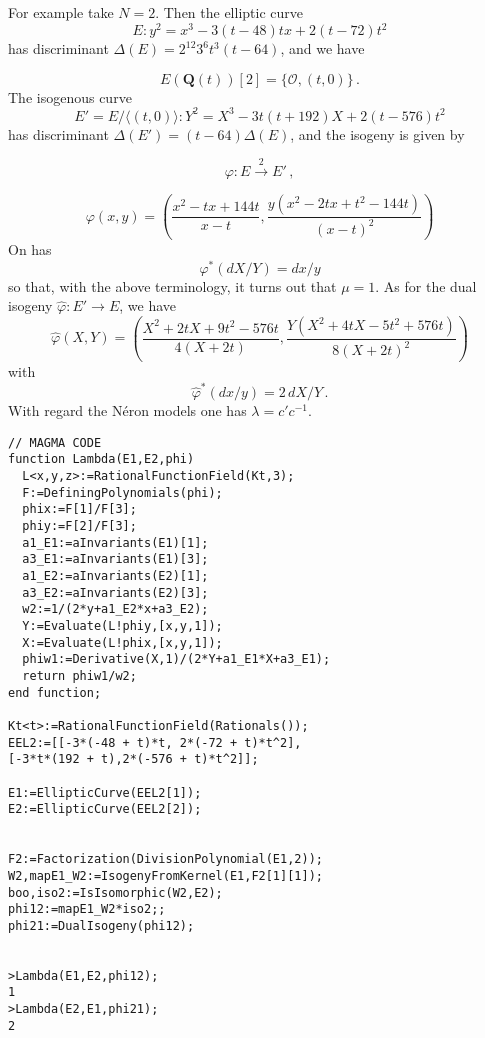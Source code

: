 \documentclass[
  journal=small,
  manuscript=article-type,  %
  year=2020,
  volume=37,
]{cup-journal}
\begin{document}
For example take $N=2$. Then the elliptic curve
$$
E:y^2 = x^3 -3(t-48)t x+ 2(t-72)t^2
$$
has discriminant $\Delta(E)=2^{12}3^6t^3(t-64)$, and we have

$$
E({\mathbf Q}(t))[2]=\{\mathcal O, (t,0)\} \,.
$$
The isogenous curve
$$
E'=E/\langle(t,0) \rangle: Y^2 = X^3 -3t(t+192)X+2(t-576)t^2
$$
has discriminant 
$\Delta(E')=(t-64) \Delta(E)$, and the isogeny is given by

$$\varphi:E\stackrel{2}{\longrightarrow} E'\,,$$

$$
\varphi(x,y)=\left(\frac{x^2-tx+144t}{x-t},\frac{y \left(x^2-2tx+t^2-144t\right)}{(x-t)^2}\right)
$$
On has
$$
\varphi^\ast (dX/Y) = dx/y
$$
so that, with the above terminology, it turns out that $\mu=1$.
As for the dual isogeny $\hat\varphi:E' \longrightarrow E$, we have
$$
\widehat{\varphi}(X,Y)=\left(\frac{X^2+2tX+9t^2-576t}{4 (X+2 t)},\frac{Y \left(X^2+4tX-5t^2+576t\right)}{8 (X+2 t)^2}\right)
$$
with
$$
\hat\varphi^\ast (dx/y) = 2\,  dX/Y \,.
$$
With regard the N\'eron models one  has 
$\lambda= c' c^{-1}$.
\newpage
\begin{verbatim}
// MAGMA CODE
function Lambda(E1,E2,phi)
  L<x,y,z>:=RationalFunctionField(Kt,3);
  F:=DefiningPolynomials(phi);
  phix:=F[1]/F[3];
  phiy:=F[2]/F[3];   
  a1_E1:=aInvariants(E1)[1];
  a3_E1:=aInvariants(E1)[3];
  a1_E2:=aInvariants(E2)[1];
  a3_E2:=aInvariants(E2)[3];
  w2:=1/(2*y+a1_E2*x+a3_E2);
  Y:=Evaluate(L!phiy,[x,y,1]);
  X:=Evaluate(L!phix,[x,y,1]);
  phiw1:=Derivative(X,1)/(2*Y+a1_E1*X+a3_E1);
  return phiw1/w2;
end function;

Kt<t>:=RationalFunctionField(Rationals());
EEL2:=[[-3*(-48 + t)*t, 2*(-72 + t)*t^2],
[-3*t*(192 + t),2*(-576 + t)*t^2]];

E1:=EllipticCurve(EEL2[1]);
E2:=EllipticCurve(EEL2[2]);


F2:=Factorization(DivisionPolynomial(E1,2));
W2,mapE1_W2:=IsogenyFromKernel(E1,F2[1][1]);
boo,iso2:=IsIsomorphic(W2,E2);
phi12:=mapE1_W2*iso2;;
phi21:=DualIsogeny(phi12);


>Lambda(E1,E2,phi12);
1
>Lambda(E2,E1,phi21);
2
\end{verbatim}
\end{document}

